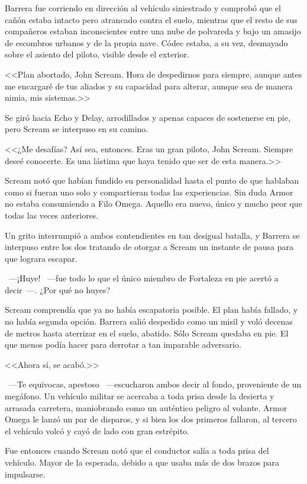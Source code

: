 Barrera fue corriendo en dirección al vehículo siniestrado y comprobó que el cañón estaba intacto pero atrancado contra el suelo, mientras que el resto de sus compañeros estaban inconscientes entre una nube de polvareda y bajo un amasijo de escombros urbanos y de la propia nave. Códec estaba, a su vez, desmayado sobre el asiento del piloto, visible desde el exterior.

<<Plan abortado, John Scream. Hora de despedirnos para siempre, aunque antes me encargaré de tus aliados y su capacidad para alterar, aunque sea de manera nimia, mis sistemas.>>

Se giró hacia Echo y Delay, arrodillados y apenas capaces de sostenerse en pie, pero Scream se interpuso en su camino.

<<¿Me desafías? Así sea, entonces. Eras un gran piloto, John Scream. Siempre deseé conocerte. Es una lástima que haya tenido que ser de esta manera.>>

Scream notó que habían fundido su personalidad hasta el punto de que hablaban como si fueran uno solo y compartieran todas las experiencias. Sin duda Armor no estaba consumiendo a Filo Omega. Aquello era nuevo, único y mucho peor que todas las veces anteriores.

Un grito interrumpió a ambos contendientes en tan desigual batalla, y Barrera se interpuso entre los dos tratando de otorgar a Scream un instante de pausa para que lograra escapar.

~---¡Huye! ~---fue todo lo que el único miembro de Fortaleza en pie acertó a decir~---. ¿Por qué no huyes?

Scream comprendía que ya no había escapatoria posible. El plan había fallado, y no había segunda opción. Barrera salió despedido como un misil y voló decenas de metros hasta aterrizar en el suelo, abatido. Sólo Scream quedaba en pie. El que menos podía hacer para derrotar a tan imparable adversario.

<<Ahora sí, se acabó.>>

~---Te equivocas, apestoso ~---escucharon ambos decir al fondo, proveniente de un megáfono. Un vehículo militar se acercaba a toda prisa desde la desierta y arrasada carretera, maniobrando como un auténtico peligro al volante. Armor Omega le lanzó un par de disparos, y si bien los dos primeros fallaron, al tercero el vehículo volcó y cayó de lado con gran estrépito.

Fue entonces cuando Scream notó que el conductor salía a toda prisa del vehículo. Mayor de la esperada, debido a que usaba más de dos brazos para impulsarse.

